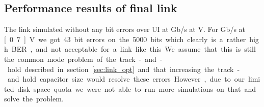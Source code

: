 \subsection{Performance results of final link}

The link simulated without any bit errors over \unit[5000]{UI} at \unit[2]{Gb/s} at \unit[1]{V}. For \unit[10]{Gb/s} at \unit[0.7]{V} we got 43 bit errors on the 5000 bits which clearly is a rather high BER, and not acceptable for a link like this. We assume that this is still the common mode problem of the track-and-hold described in section \ref{sec:link_opt} and that increasing the track-and.hold capacitor size would resolve these errors. However, due to our limited disk space quota we were not able to run more simulations on that and solve the problem.



